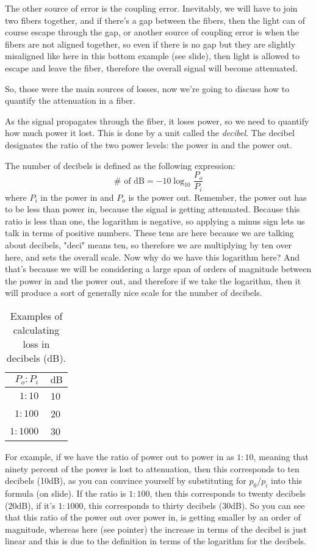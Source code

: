 The other source of error is the coupling error. Inevitably, we will have to join two fibers together, and if there's a gap between the fibers, then the light can of course escape through the gap, or another source of coupling error is when the fibers are not aligned together, so even if there is no gap but they are slightly misaligned like here in this bottom example (see slide), then light is allowed to escape and leave the fiber, therefore the overall signal will become attenuated.

So, those were the main sources of losses, now we're going to discuss how to quantify the attenuation in a fiber.

As the signal propagates through the fiber, it loses power, so we need to quantify how much power it lost. This is done by a unit called the \emph{decibel}. The decibel designates the ratio of the two power levels: the power in and the power out.

The number of decibels is defined as the following expression:
\begin{equation}
\# \text { of } \mathrm{dB}=-10 \log _{10} \frac{P_o}{P_i}
\end{equation}
where $P_i$ in the power in and $P_o$ is the power out. Remember, the power out has to be less than power in, because the signal is getting attenuated.  Because this ratio is less than one, the logarithm is negative, so applying a minus sign lets us talk in terms of positive numbers. These tens are here because we are talking about decibels, "deci" means ten, so therefore we are multiplying by ten over here, and sets the overall scale. Now why do we have this logarithm here? And that's because we will be considering a large span of orders of magnitude between the power in and the power out, and therefore if we take the logarithm, then it will produce a sort of generally nice scale for the number of decibels.
\begin{table}
\centering
\begin{tabular}{r|c}
$P_o: P_i$ & $\mathrm{~dB}$ \\
\hline $1: 10$ & 10 \\
$1: 100$ & 20 \\
$1: 1000$ & 30
\end{tabular}
\caption{Examples of calculating loss in decibels (dB).}
\label{tab:decibels}
\end{table}

For example, if we have the ratio of power out to power in as $1:10$, meaning that ninety percent of the power is lost to attenuation, then this corresponds to ten decibels (10dB), as you can convince yourself by substituting for $p_0/p_i$ into this formula (on slide). If the ratio is $1:100$, then this corresponds to twenty decibels (20dB), if it's $1:1000$, this corresponds to thirty decibels (30dB). So you can see that this ratio of the power out over power in, is getting smaller by an order of magnitude, whereas here (see pointer) the increase in terms of the decibel is just linear and this is due to the definition in terms of the logarithm for the decibels.

